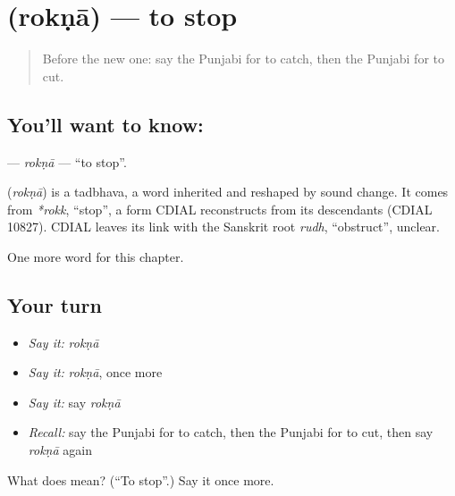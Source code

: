 \section[\texorpdfstring{\pa{ਰੋਕਣਾ} (rokṇā)}{ਰੋਕਣਾ (rokṇā)}]{ (rokṇā) — to stop}

\label{lesson:PA-C61-rokna}



\begin{quote}
Before the new one: say the Punjabi for to catch, then the Punjabi for to cut.
\end{quote}

\subsection*{You'll want to know: }
\textbf{} — \emph{rokṇā} — \textquotedblleft{}to stop\textquotedblright{}.

\begin{cousinweb}
\textbf{} (\emph{rokṇā}) is a tadbhava, a word inherited and reshaped by sound change. It comes from \emph{*rokk}, \textquotedblleft{}stop\textquotedblright{}, a form CDIAL reconstructs from its descendants (CDIAL 10827). CDIAL leaves its link with the Sanskrit root \emph{rudh}, \textquotedblleft{}obstruct\textquotedblright{}, unclear.
\end{cousinweb}

\begin{grammarlens}[title={What you've built}]
One more word for this chapter.
\end{grammarlens}

\subsection*{Your turn}
\begin{itemize}
\raggedright
  \item \emph{Say it:} \emph{rokṇā}
  \item \emph{Say it:} \emph{rokṇā}, once more
  \item \emph{Say it:} say \emph{rokṇā}
  \item \emph{Recall:} say the Punjabi for to catch, then the Punjabi for to cut, then say \emph{rokṇā} again
\end{itemize}

\begin{tcolorbox}[breakable,colback=teal!4,colframe=teal!35!black,title={Before you move on}]
What does  mean? (\textquotedblleft{}To stop\textquotedblright{}.) Say it once more.
\end{tcolorbox}
